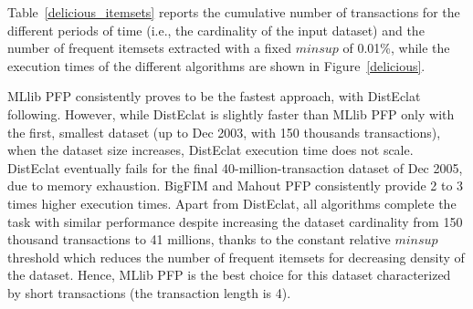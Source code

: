 Table~\ref{delicious_itemsets} reports the cumulative number of
transactions for the different periods of time
(i.e., the cardinality of the input dataset) and the
number of frequent itemsets extracted with a fixed $minsup$ of 0.01\%,
while the execution times of the
different algorithms are shown in Figure~\ref{delicious}.


MLlib PFP consistently proves to be the fastest approach, with DistEclat following.
However, while DistEclat is slightly faster than MLlib PFP only with the first, smallest dataset
(up to Dec 2003, with 150 thousands transactions), when the dataset size increases,
DistEclat execution time does not scale. DistEclat eventually fails for the final
40-million-transaction dataset of Dec 2005, due to memory exhaustion.
BigFIM and Mahout PFP consistently provide 2 to 3 times higher execution times.
Apart from DistEclat, all algorithms complete the task with similar performance
despite increasing the dataset cardinality from 150 thousand transactions to 41 millions,
thanks to the constant relative $minsup$ threshold
which reduces the number of frequent itemsets
for decreasing density of the dataset.
Hence, MLlib PFP is the best choice for this dataset characterized by short transactions
(the transaction length is 4).



